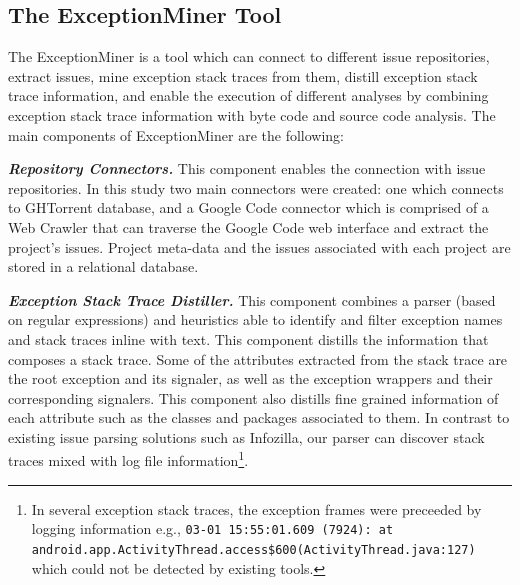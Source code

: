 \subsection{The ExceptionMiner Tool}
\label{sec:exceptionminer}

The ExceptionMiner is a tool which can connect to different issue repositories, 
extract issues, mine exception stack traces from them, distill exception stack trace information,
and enable the execution of different analyses by combining exception stack 
trace information with byte code and source code analysis. The main components of ExceptionMiner are the following:

\emph{\textbf{Repository Connectors.}} This component enables the connection 
with issue repositories. In this study two main connectors were created: one which connects to 
GHTorrent database, and a Google Code connector which is comprised of a Web Crawler
 that can traverse the Google Code web interface and extract the project's issues. 
Project meta-data and the issues associated with each project are stored in a relational 
database.

\emph{\textbf{Exception Stack Trace Distiller.}}
This component combines a parser (based on regular expressions) 
and heuristics able to identify and filter exception names and stack traces inline with text. 
This component distills the information that composes a stack trace.
 Some of the attributes extracted from the stack trace are
 the root exception and its signaler, as well as the exception wrappers and their corresponding signalers. 
This component also distills fine grained information of each attribute such as the classes and packages associated to them.
In contrast to existing issue parsing solutions such as Infozilla, our parser
 can discover stack traces mixed with log file information\footnote{In several 
exception stack traces, the exception frames were preceeded by logging information e.g., 
\texttt{03-01 15:55:01.609 (7924): at android.app.ActivityThread.access\$600(ActivityThread\-.java:127)} which could not be detected by existing tools.}.

